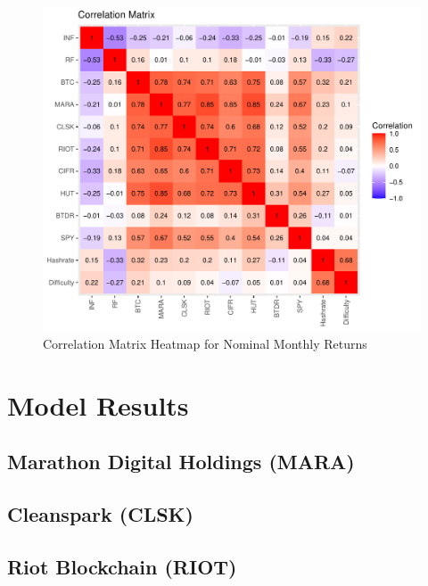 \documentclass[]{article}
\begin{document}
\begin{figure}[htbp]
	\label{finalcorplot}
	\caption{Correlation Matrix Heatmap for Nominal Monthly Returns}
	\includegraphics[width=\linewidth]{finalcorplot.pdf}
\end{figure}

\pagebreak

\section{Model Results}

\subsection{Marathon Digital Holdings (MARA)}



\pagebreak

\subsection{Cleanspark (CLSK)}



\pagebreak

\subsection{Riot Blockchain (RIOT)}
\end{document}

